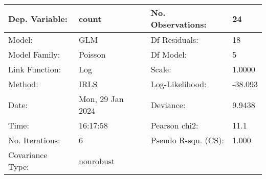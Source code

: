 \begin{tabular}{llll}
\toprule
Dep. Variable: & count &   No. Observations:   &     24 \\
\midrule
Model: & GLM &   Df Residuals:       &     18 \\
Model Family: & Poisson &   Df Model:           &      5 \\
Link Function: & Log &   Scale:              &   1.0000 \\
Method: & IRLS &   Log-Likelihood:     &  -38.093 \\
Date: & Mon, 29 Jan 2024 &   Deviance:           &   9.9438 \\
Time: & 16:17:58 &   Pearson chi2:       &   11.1 \\
No. Iterations: & 6 &   Pseudo R-squ. (CS): &  1.000 \\
Covariance Type: & nonrobust &                       &   \\
\bottomrule
\end{tabular}
